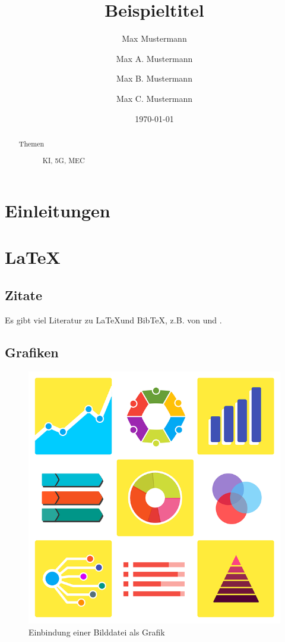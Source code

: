 \documentclass[
	floatfix,
	aps,
	pra,
	twocolumn,
  	reprint,
  	superscriptaddress
]{revtex4-2}
\begin{document}
	\title{Beispieltitel}
	\author{Max Mustermann}
	 \author{Max A. Mustermann}
	 \author{Max B. Mustermann}
	 \author{Max C. Mustermann}
	
	 
	\date{\today}
	\begin{abstract}
		\blindtext

		\begin{description}
			\item[Themen] KI, 5G, MEC
		\end{description}
		
	\end{abstract}
		
	
	\maketitle
	
	\section{\label{sec:level1}Einleitungen}
	\blindtext
	\section{\LaTeX}
	\subsection{Zitate}
	Es gibt viel Literatur zu \LaTeX und BibTeX, z.B. von \citet{Tadros2013} und \citet{Graetzer1996}.
	\subsection{Grafiken}
	\begin{figure}[htbp]
		\includegraphics[width=\linewidth]{statistic-1564428_640}
		\caption{Einbindung einer Bilddatei als Grafik \cite{PixabayStatistic2021}}
	\end{figure}
\end{document}
